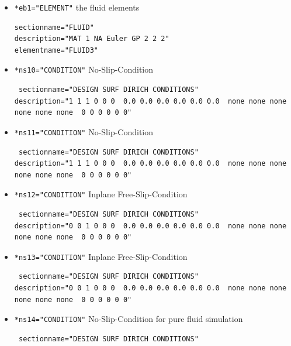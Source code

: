 \begin{itemize}
 \item \verb|*eb1="ELEMENT"| \qquad the fluid elements
 \begin{small} \begin{verbatim}
sectionname="FLUID"
description="MAT 1 NA Euler GP 2 2 2"
elementname="FLUID3"
\end{verbatim} \end{small}


 \item \verb|*ns10="CONDITION"| \qquad No-Slip-Condition
\begin{small} \begin{verbatim} sectionname="DESIGN SURF DIRICH CONDITIONS"
description="1 1 1 0 0 0  0.0 0.0 0.0 0.0 0.0 0.0  none none none none none none  0 0 0 0 0 0"
\end{verbatim} \end{small} \item \verb|*ns11="CONDITION"| \qquad No-Slip-Condition
\begin{small} \begin{verbatim} sectionname="DESIGN SURF DIRICH CONDITIONS"
description="1 1 1 0 0 0  0.0 0.0 0.0 0.0 0.0 0.0  none none none none none none  0 0 0 0 0 0"
\end{verbatim} \end{small} \item \verb|*ns12="CONDITION"| \qquad Inplane Free-Slip-Condition
\begin{small} \begin{verbatim} sectionname="DESIGN SURF DIRICH CONDITIONS"
description="0 0 1 0 0 0  0.0 0.0 0.0 0.0 0.0 0.0  none none none none none none  0 0 0 0 0 0"
\end{verbatim} \end{small} \item \verb|*ns13="CONDITION"| \qquad Inplane Free-Slip-Condition
\begin{small} \begin{verbatim} sectionname="DESIGN SURF DIRICH CONDITIONS"
description="0 0 1 0 0 0  0.0 0.0 0.0 0.0 0.0 0.0  none none none none none none  0 0 0 0 0 0"
\end{verbatim} \end{small} \item \verb|*ns14="CONDITION"| \qquad No-Slip-Condition for pure fluid simulation
\begin{small} \begin{verbatim} sectionname="DESIGN SURF DIRICH CONDITIONS"

\end{verbatim}
\end{small}
\end{itemize}

